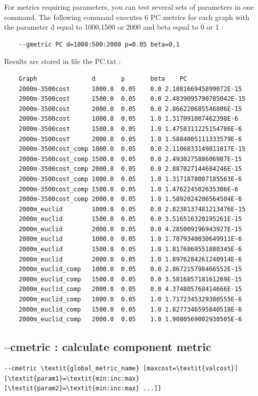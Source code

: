 \documentclass[a4paper,10pt]{report}
\begin{document}
For metrics requiring parameters, you can test several sets of parameters in one command. 
The following command executes 6 PC metrics for each graph with the parameter d equal to 1000,1500 or 2000 and beta equal to 0 or 1 :
\begin{Verbatim}
	--gmetric PC d=1000:500:2000 p=0.05 beta=0,1
\end{Verbatim}
Results are stored in file the PC.txt :
\begin{Verbatim}
	Graph               d     	p   	beta	PC
	2000m-3500cost      1000.0	0.05	0.0	2.108166945899072E-15
	2000m-3500cost      1500.0	0.05	0.0	2.4839095790785042E-15
	2000m-3500cost      2000.0	0.05	0.0	2.866220685546806E-15
	2000m-3500cost      1000.0	0.05	1.0	1.317091007462398E-6
	2000m-3500cost      1500.0	0.05	1.0	1.4758311225154786E-6
	2000m-3500cost      2000.0	0.05	1.0	1.5884005111333579E-6
	2000m-3500cost_comp 1000.0	0.05	0.0	2.1106833149811817E-15
	2000m-3500cost_comp 1500.0	0.05	0.0	2.493027588606987E-15
	2000m-3500cost_comp 2000.0	0.05	0.0	2.887027144684246E-15
	2000m-3500cost_comp 1000.0	0.05	1.0	1.3171878007185563E-6
	2000m-3500cost_comp 1500.0	0.05	1.0	1.476224502635306E-6
	2000m-3500cost_comp 2000.0	0.05	1.0	1.5892024206564504E-6
	2000m_euclid        1000.0	0.05	0.0	2.8238137481213476E-15
	2000m_euclid        1500.0	0.05	0.0	3.516516320195261E-15
	2000m_euclid        2000.0	0.05	0.0	4.285009196943927E-15
	2000m_euclid        1000.0	0.05	1.0	1.7079340030649911E-6
	2000m_euclid        1500.0	0.05	1.0	1.8176869551880345E-6
	2000m_euclid        2000.0	0.05	1.0	1.8976284261240914E-6
	2000m_euclid_comp   1000.0	0.05	0.0	2.867215798466552E-15
	2000m_euclid_comp   1500.0	0.05	0.0	3.581685718161269E-15
	2000m_euclid_comp   2000.0	0.05	0.0	4.374805768414666E-15
	2000m_euclid_comp   1000.0	0.05	1.0	1.7172345329380555E-6
	2000m_euclid_comp   1500.0	0.05	1.0	1.8277346595840518E-6
	2000m_euclid_comp   2000.0	0.05	1.0	1.9080569002930505E-6
\end{Verbatim}


\subsection{--cmetric : calculate component metric}
\begin{Verbatim}[commandchars=\\\{\}]
--cmetric \textit{global_metric_name} [maxcost=\textit{valcost}] [\textit{param1}=\textit{min:inc:max} [\textit{param2}=\textit{min:inc:max} ...]]
\end{Verbatim}
\end{document}
